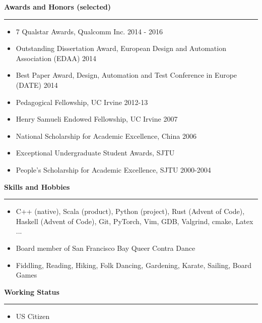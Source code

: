 \documentclass[10pt,A4]{article}
\newcommand{\cvsection}[1]
{
	\begin{flushleft}
  \LARGE\textcolor{sectcol}{\textbf{  #1}}
	\end{flushleft}
  \vspace{-15pt}
  \textcolor{softcol}{\hrule}
  \vspace{8pt}
}
\newcommand{\mystrut}{\rule[-.3\baselineskip]{0pt}{\baselineskip}}
\begin{document}
\cvsection{Awards and Honors (selected)}
\vspace{-4pt}
\begin{itemize}
 \setlength\itemsep{-0.1cm}
 \item 7 Qualstar Awards, Qualcomm Inc. 2014 - 2016
 \item Outstanding Dissertation Award, European Design and Automation Association (EDAA) 2014
 \item Best Paper Award, Design, Automation and Test Conference in Europe (DATE) 2014
 \item Pedagogical Fellowship, UC Irvine 2012-13
 \item Henry Samueli Endowed Fellowship, UC Irvine 2007
 \item National Scholarship for Academic Excellence, China 2006
 \item Exceptional Undergraduate Student Awards, SJTU
 \item People's Scholarship for Academic Excellence, SJTU 2000-2004
\end{itemize}

\cvsection{Skills and Hobbies}
\vspace{-4pt}
\begin{itemize}
 \setlength\itemsep{-0.1cm}
 \item C++ (native), Scala (product), Python (project), Rust (Advent of Code), Haskell (Advent of Code),  Git, PyTorch, Vim, GDB, Valgrind, cmake, Latex ...
 \item Board member of San Francisco Bay Queer Contra Dance
 \item Fiddling, Reading, Hiking, Folk Dancing, Gardening, Karate, Sailing, Board Games
\end{itemize}

\cvsection{Working Status}
\vspace{-4pt}
\begin{itemize}
 \item US Citizen
\end{itemize}







%
%
%
%
%
%
\end{document}
